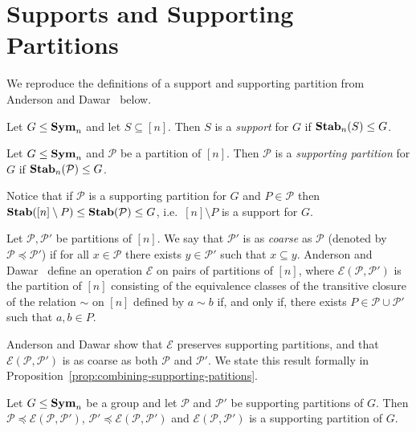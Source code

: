 \documentclass[../main/thesis.tex]{subfiles}
\begin{document}
\section{Supports and Supporting Partitions}
We reproduce the definitions of a support and supporting partition from Anderson
and Dawar~\cite{AndersonD17} below.

\begin{definition}
  Let $G \leq \text{\textbf{Sym}}_n$ and let $S \subseteq [n]$. Then $S$ is a \emph{support}
  for $G$ if $\text{\textbf{Stab}}_n(S) \leq G$.
\end{definition}

\begin{definition}
  Let $G \leq \text{\textbf{Sym}}_n$ and $\mathcal{P}$ be a partition of $[n]$. Then
  $\mathcal{P}$ is a \emph{supporting partition} for $G$ if
  $\text{\textbf{Stab}}_n(\mathcal{P}) \leq G$.
\end{definition}

Notice that if $\mathcal{P}$ is a supporting partition for $G$ and $P \in
\mathcal{P}$ then $\text{\textbf{Stab}}([n] \setminus P) \leq \text{\textbf{Stab}}(\mathcal{P}) \leq G$, i.e.\
$[n] \setminus P$ is a support for $G$.

Let $\mathcal{P}, \mathcal{P}'$ be partitions of $[n]$. We say that
$\mathcal{P}'$ is as \emph{coarse} as $\mathcal{P}$ (denoted by $\mathcal{P}
\preceq \mathcal{P}'$) if for all $x \in \mathcal{P}$ there exists $y \in
\mathcal{P}'$ such that $x \subseteq y$. Anderson and Dawar~\cite{AndersonD17}
define an operation $\mathcal{E}$ on pairs of partitions of $[n]$, where
$\mathcal{E} (\mathcal{P}, \mathcal{P}')$ is the partition of $[n]$ consisting
of the equivalence classes of the transitive closure of the relation $\sim$ on
$[n]$ defined by $a \sim b$ if, and only if, there exists $P \in \mathcal{P}
\cup \mathcal{P}'$ such that $a,b \in P$.

Anderson and Dawar show that $\mathcal{E}$ preserves supporting partitions, and
that $\mathcal{E}(\mathcal{P}, \mathcal{P}')$ is as coarse as both $\mathcal{P}$
and $\mathcal{P}'$. We state this result formally in
Proposition~\ref{prop:combining-supporting-patitions}.

\begin{prop}
  \label{prop:combining-supporting-patitions}
  Let $G \leq \text{\textbf{Sym}}_n$ be a group and let $\mathcal{P}$ and $\mathcal{P}'$ be
  supporting partitions of $G$. Then $\mathcal{P} \preceq
  \mathcal{E}(\mathcal{P}, \mathcal{P}')$, $ \mathcal{P}' \preceq
  \mathcal{E}(\mathcal{P}, \mathcal{P}')$ and $\mathcal{E}(\mathcal{P},
  \mathcal{P}')$ is a supporting partition of $G$.
\end{prop}
\end{document}
